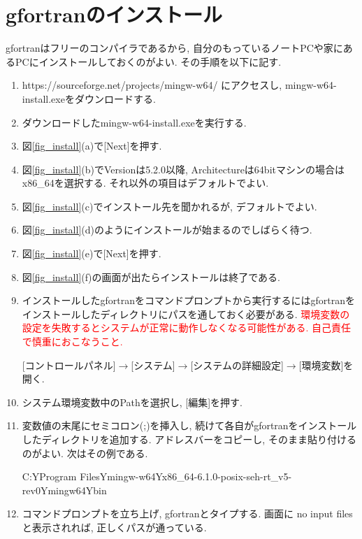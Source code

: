 \chapter{gfortranのインストール}
gfortranはフリーのコンパイラであるから,
自分のもっているノートPCや家にあるPCにインストールしておくのがよい.
その手順を以下に記す.

\begin{enumerate}
\item https://sourceforge.net/projects/mingw-w64/ にアクセスし, mingw-w64-install.exeをダウンロードする.
\item ダウンロードしたmingw-w64-install.exeを実行する.
\item 図\ref{fig_install}(a)で[Next]を押す.
\item 図\ref{fig_install}(b)でVersionは5.2.0以降, Architectureは64bitマシンの場合はx86\_64を選択する. それ以外の項目はデフォルトでよい.
\item 図\ref{fig_install}(c)でインストール先を聞かれるが, デフォルトでよい.
\item 図\ref{fig_install}(d)のようにインストールが始まるのでしばらく待つ.
\item 図\ref{fig_install}(e)で[Next]を押す.
\item 図\ref{fig_install}(f)の画面が出たらインストールは終了である.
\item インストールしたgfortranをコマンドプロンプトから実行するにはgfortranをインストールしたディレクトリにパスを通しておく必要がある.
\textcolor{red}{環境変数の設定を失敗するとシステムが正常に動作しなくなる可能性がある. 自己責任で慎重におこなうこと. }

[コントロールパネル]$\to$[システム]$\to$[システムの詳細設定]$\to$[環境変数]を開く.
\item システム環境変数中のPathを選択し, [編集]を押す.
\item 変数値の末尾にセミコロン(;)を挿入し, 続けて各自がgfortranをインストールしたディレクトリを追加する.
アドレスバーをコピーし, そのまま貼り付けるのがよい. 次はその例である.

C:Y\llap{=}Program FilesY\llap{=}mingw-w64Y\llap{=}x86\_64-6.1.0-posix-seh-rt\_v5-rev0Y\llap{=}mingw64Y\llap{=}bin

\item コマンドプロンプトを立ち上げ, gfortranとタイプする. 画面に no input files と表示されれば, 正しくパスが通っている.
\end{enumerate}

